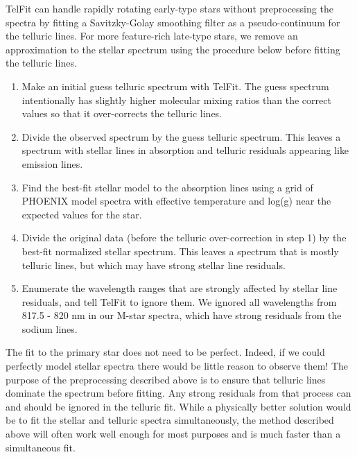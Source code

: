 TelFit can handle rapidly rotating early-type stars without preprocessing the spectra by fitting a Savitzky-Golay smoothing filter \citep{savitzky1964} as a pseudo-continuum for the telluric lines. For more feature-rich late-type stars, we remove an approximation to the stellar spectrum using the procedure below before fitting the telluric lines.

\begin{enumerate}
  \item Make an initial guess telluric spectrum with TelFit. The guess spectrum intentionally has slightly higher molecular mixing ratios than the correct values so that it over-corrects the telluric lines.
  \item Divide the observed spectrum by the guess telluric spectrum. This leaves a spectrum with stellar lines in absorption and telluric residuals appearing like emission lines.
  \item Find the best-fit stellar model to the absorption lines using a grid of PHOENIX model spectra \citep{Hauschildt1999} with effective temperature and log(g) near the expected values for the star.
  \item Divide the original data (before the telluric over-correction in step 1) by the best-fit normalized stellar spectrum. This leaves a spectrum that is mostly telluric lines, but which may have strong stellar line residuals.
  \item Enumerate the wavelength ranges that are strongly affected by stellar line residuals, and tell TelFit to ignore them. We ignored all wavelengths from 817.5 - 820 nm in our M-star spectra, which have strong residuals from the sodium lines.
\end{enumerate}

The fit to the primary star does not need to be perfect. Indeed, if we could perfectly model stellar spectra there would be little reason to observe them! The purpose of the preprocessing described above is to ensure that telluric lines dominate the spectrum before fitting. Any strong residuals from that process can and should be ignored in the telluric fit. While a physically better solution would be to fit the stellar and telluric spectra simultaneously, the method described above will often work well enough  for most purposes and is much faster than a simultaneous fit.


